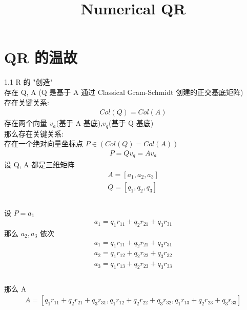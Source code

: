 \documentclass[12pt]{article}
\title{Numerical QR}
\date{}
\begin{document}
\maketitle

\section{QR 的温故}
\begin{flushleft}

    1.1 R 的 "创造" \\
    存在 Q, A (Q 是基于 A 通过 Classical Gram-Schmidt 创建的正交基底矩阵) \\
    存在关键关系: \\
    \begin{align}
        Col(Q) = Col(A)
    \end{align}
    存在两个向量 $v_{a}$(基于 A 基底),$v_{q}$(基于 Q 基底) \\
    那么存在关键关系: \\
    存在一个绝对向量坐标点 $P \in (Col(Q) = Col(A))$ \\
    \begin{align}
        P = Qv_{q} = Av_{a}
    \end{align}
    设 Q, A 都是三维矩阵 \\
    \begin{align}
        A = [a_{1}, a_{2}, a_{3}] \\
        Q = [q_{1}, q_{2}, q_{3}] \\
    \end{align} \\
    设 $P = a_{1}$ \\
    \begin{align}
        a_{1} = q_{1}r_{11} + q_{2}r_{21} + q_{3}r_{31}
    \end{align}
    那么 $a_{2}, a_{3}$ 依次 \\
    \begin{align}
        a_{1} = q_{1}r_{11} + q_{2}r_{21} + q_{3}r_{31}  \\
        a_{2} = q_{1}r_{12}  + q_{2}r_{22} + q_{3}r_{32} \\
        a_{3} = q_{1}r_{13}  + q_{2}r_{23} + q_{3}r_{33} \\
    \end{align} \\
    那么 A \\
    \begin{align}
        A = [q_{1}r_{11} + q_{2}r_{21} + q_{3}r_{31}, q_{1}r_{12}  + q_{2}r_{22} + q_{3}r_{32},q_{1}r_{13}  + q_{2}r_{23} + q_{3}r_{33}] \\

\end{align}
\end{flushleft}
\end{document}
